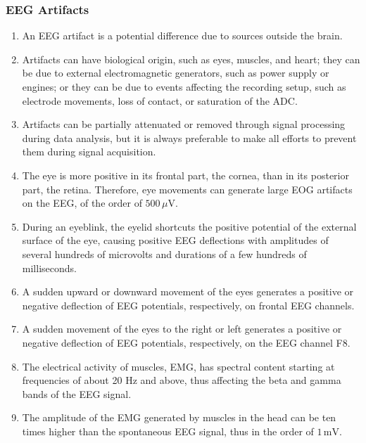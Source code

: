 \subsubsection{EEG Artifacts}

\begin{enumerate}[label=\arabic*.]
    \item An EEG artifact is a potential difference due to sources outside the brain.
    
    \item Artifacts can have biological origin, such as eyes, muscles, and heart; they can be due to external electromagnetic generators, such as power supply or engines; or they can be due to events affecting the recording setup, such as electrode movements, loss of contact, or saturation of the ADC.
    
    \item Artifacts can be partially attenuated or removed through signal processing during data analysis, but it is always preferable to make all efforts to prevent them during signal acquisition.
    
    \item The eye is more positive in its frontal part, the cornea, than in its posterior part, the retina. Therefore, eye movements can generate large EOG artifacts on the EEG, of the order of $500\,\mu\text{V}$.
    
    \item During an eyeblink, the eyelid shortcuts the positive potential of the external surface of the eye, causing positive EEG deflections with amplitudes of several hundreds of microvolts and durations of a few hundreds of milliseconds.
    
    \item A sudden upward or downward movement of the eyes generates a positive or negative deflection of EEG potentials, respectively, on frontal EEG channels.
    
    \item A sudden movement of the eyes to the right or left generates a positive or negative deflection of EEG potentials, respectively, on the EEG channel F8.
    
    \item The electrical activity of muscles, EMG, has spectral content starting at frequencies of about 20 Hz and above, thus affecting the beta and gamma bands of the EEG signal.
    
    \item The amplitude of the EMG generated by muscles in the head can be ten times higher than the spontaneous EEG signal, thus in the order of $1\,\text{mV}$.
    

\end{enumerate}
